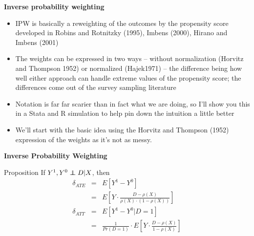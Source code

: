 \documentclass[notes=show]{beamer}
\newcommand\independent{\protect\mathpalette{\protect\independenT}{\perp}}
\def\independenT#1#2{\mathrel{\rlap{$#1#2$}\mkern2mu{#1#2}}}
\begin{document}
\begin{frame}[plain]
\begin{center}
\textbf{Inverse probability weighting}
\end{center}

\begin{itemize}
	\item IPW is basically a reweighting of the outcomes by the propensity score developed in Robins and Rotnitzky (1995), Imbens (2000), Hirano and Imbens (2001)
	\item The weights can be expressed in two ways -- without normalization (Horvitz and Thompson 1952) or normalized (Hajek1971) -- the difference being how well either approach can handle extreme values of the propensity score; the differences come out of the survey sampling literature 
	\item Notation is far far scarier than in fact what we are doing, so I'll show you this in a Stata and R simulation to help pin down the intuition a little better
	\item We'll start with the basic idea using the Horvitz and Thompson (1952) expression of the weights as it's not as messy.
\end{itemize}

\end{frame}
	
	

\begin{frame}[plain]
	\begin{center}
	\textbf{Inverse Probability Weighting}
	\end{center}
	
		\begin{block}{Proposition}
	If $Y^1,Y^0 \independent{D}|X$, then
		\begin{eqnarray*}
		\delta_{ATE}&=&E[Y^1-Y^0] \\
		&=&E \left[ Y \cdot  \frac{D - \rho(X)}{\rho(X) \cdot (1-\rho(X))} \right]\\
		\delta_{ATT}&=&E[Y^1-Y^0|D=1] \\
		&=& \frac{1}{Pr(D=1)} \cdot  E \left[ Y \cdot \frac{D-\rho(X)}{1-\rho(X)} \right]
		\end{eqnarray*}
	\end{block}

\end{frame}
\end{document}
